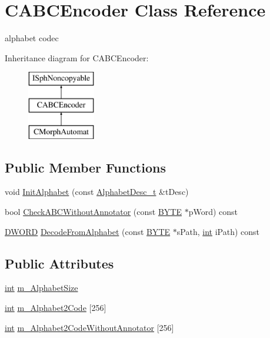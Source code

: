 \hypertarget{classCABCEncoder}{\section{C\-A\-B\-C\-Encoder Class Reference}
\label{classCABCEncoder}
}


alphabet codec  


Inheritance diagram for C\-A\-B\-C\-Encoder\-:\begin{figure}[H]
\begin{center}
\leavevmode
\includegraphics[height=3.000000cm]{classCABCEncoder}
\end{center}
\end{figure}
\subsection*{Public Member Functions}
\begin{DoxyCompactItemize}
\item 
void \hyperlink{classCABCEncoder_a93dec7e8aa0490bc4ff9d0170866b943}{Init\-Alphabet} (const \hyperlink{structAlphabetDesc__t}{Alphabet\-Desc\-\_\-t} \&t\-Desc)
\item 
bool \hyperlink{classCABCEncoder_a830ffa762cd730339592386cb8ac84cd}{Check\-A\-B\-C\-Without\-Annotator} (const \hyperlink{sphinxstd_8h_a4ae1dab0fb4b072a66584546209e7d58}{B\-Y\-T\-E} $\ast$p\-Word) const 
\item 
\hyperlink{sphinxstd_8h_a798af1e30bc65f319c1a246cecf59e39}{D\-W\-O\-R\-D} \hyperlink{classCABCEncoder_a5c1403b4147322677b9db7b275a707aa}{Decode\-From\-Alphabet} (const \hyperlink{sphinxstd_8h_a4ae1dab0fb4b072a66584546209e7d58}{B\-Y\-T\-E} $\ast$s\-Path, \hyperlink{sphinxexpr_8cpp_a4a26e8f9cb8b736e0c4cbf4d16de985e}{int} i\-Path) const 
\end{DoxyCompactItemize}
\subsection*{Public Attributes}
\begin{DoxyCompactItemize}
\item 
\hyperlink{sphinxexpr_8cpp_a4a26e8f9cb8b736e0c4cbf4d16de985e}{int} \hyperlink{classCABCEncoder_a15d9a934285856375e6939e2707ed952}{m\-\_\-\-Alphabet\-Size}
\item 
\hyperlink{sphinxexpr_8cpp_a4a26e8f9cb8b736e0c4cbf4d16de985e}{int} \hyperlink{classCABCEncoder_ae1233e446eb7487c18ab3a4700fd3613}{m\-\_\-\-Alphabet2\-Code} \mbox{[}256\mbox{]}
\item 
\hyperlink{sphinxexpr_8cpp_a4a26e8f9cb8b736e0c4cbf4d16de985e}{int} \hyperlink{classCABCEncoder_ac97273f3eea3bbf9f1390b271617119e}{m\-\_\-\-Alphabet2\-Code\-Without\-Annotator} \mbox{[}256\mbox{]}
\end{DoxyCompactItemize}



